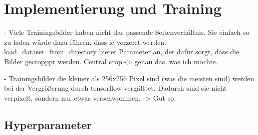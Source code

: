 \chapter{Implementierung und Training}
- Viele Trainingsbilder haben nicht das passende Seitenverhältnis. Sie einfach so zu laden würde dazu führen, dass ie verzerrt werden. load_dataset_from_directory bietet Parameter an, der dafür sorgt, dass die Bilder gecropppt werden. Central crop -> genau das, was ich möchte.

- Trainingsbilder die kleiner als 256x256 Pixel sind (was die meisten sind) werden bei der Vergrößerung durch tensorflow vergälttet. Dadurch sind sie nicht verpixelt, sondern nur etwas verschwommen. -> Gut so.
\section{Hyperparameter}